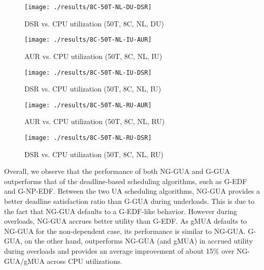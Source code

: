 \documentclass[12pt,dvips]{report}
\begin{document}
\begin{figure} [htbp]
  \centering
  \texttt{[image: ./results/8C-50T-NL-DU-DSR]}
  \caption{ DSR vs. CPU utilization (50T, 8C, NL, DU) }
  \label{fig:8C-50T-NL-DU-DSR}
\end{figure}
 
\begin{figure} [htbp]
  \centering
  \texttt{[image: ./results/8C-50T-NL-IU-AUR]}
  \caption{AUR vs. CPU utilization (50T, 8C, NL, IU)}
  \label{fig:8C-50T-NL-IU-AUR}
\end{figure}
 
\begin{figure} [htbp]
  \centering
  \texttt{[image: ./results/8C-50T-NL-IU-DSR]}
  \caption{DSR vs. CPU utilization (50T, 8C, NL, IU)}
  \label{fig:8C-50T-NL-IU-DSR}
\end{figure}
 
\begin{figure} [htbp]
  \centering
  \texttt{[image: ./results/8C-50T-NL-RU-AUR]}
  \caption{AUR vs. CPU utilization (50T, 8C, NL, RU)}
  \label{fig:8C-50T-NL-RU-AUR}
\end{figure}
 
\begin{figure} [htbp]
  \centering
  \texttt{[image: ./results/8C-50T-NL-RU-DSR]}
  \caption{DSR vs. CPU utilization (50T, 8C, NL, RU)}
  \label{fig:8C-50T-NL-RU-DSR}
\end{figure}
 
Overall, we observe that the performance of both NG-GUA and G-GUA outperforms that of the deadline-based scheduling algorithms, such as G-EDF and G-NP-EDF. Between the two UA scheduling algorithms, NG-GUA provides a better deadline satisfaction ratio than G-GUA during underloads. This is due to the fact that NG-GUA defaults to a G-EDF-like behavior. However during overloads, NG-GUA accrues better utility than G-EDF. As gMUA defaults to NG-GUA for the non-dependent case, its performance is similar to NG-GUA. G-GUA, on the other hand, outperforms NG-GUA (and gMUA) in accrued utility during overloads and provides an average improvement of about 15\% over NG-GUA/gMUA across CPU utilizations.
\end{document}
